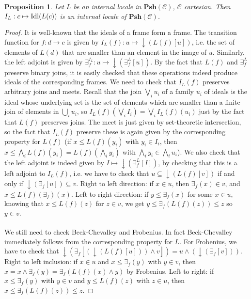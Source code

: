 \documentclass{article}
\newtheorem{proposition}[theorem]{Proposition}
\begin{document}
\begin{proposition}
    Let $L$ be an internal locale in $\mathbf{Psh}(\mathcal{C})$, $\mathcal{C}$ cartesian. Then $I_L: c\mapsto \textup{Idl}(L(c))$ is an internal locale of $\mathbf{Psh}(\mathcal{C})$.
\end{proposition}
\begin{proof}
    It is well-known that the ideals of a frame form a frame. The transition function for $f:d\xrightarrow{}c$ is given by $I_L(f): u \mapsto \downarrow (L(f)[u])$, i.e. the set of elements of $L(d)$ that are smaller than an element in the image of $u$. Similarly, the left adjoint is given by $\exists_f^{I_L}: u \mapsto \downarrow (\exists_f^{L}[u])$. By the fact that $L(f)$ and $\exists_f^L$ preserve binary joins, it is easily checked that these operations indeed produce ideals of the corresponding frames. We  need to check that $I_L(f)$ preserves arbitrary joins and meets. Recall that the join $\bigvee_i u_i$ of a family $u_i$ of ideals is the ideal whose underlying set is the set of elements which are smaller than a finite join of elements in $\bigcup_i u_i$, so $I_L(f)(\bigvee_i I_i)=\bigvee_i I_L(f)(u_i)$ just by the fact that $L(f)$ preserves joins. The meet is just given by set-theoretic intersection, so the fact that $I_L(f)$ preserve these is again given by the corresponding property for $L(f)$ (if $x\leq L(f)(y_i)$ with $y_i\in I_i$, then $x\leq \bigwedge_i L(f)(y_i)=L(f)(\bigwedge_i y_i)$ with $\bigwedge_i y_i\in\bigwedge_i u_i$). We also check that the left adjoint is indeed given by $I \mapsto \downarrow (\exists_f^{L}[I])$, by checking that this is a left adjoint to $I_L(f)$, i.e. we have to check that $u\subseteq \downarrow (L(f)[v])$ if and only if $\downarrow (\exists_f[u])\subseteq v$. Right to left direction: if $x\in u$, then $\exists_f (x)\in v$, and $x\leq L(f)(\exists_f)(x)$. Left to right direction: if $y\leq \exists_f(x)$ for some $x\in u$, knowing that $x\leq L(f)(z)$ for $z\in v$, we get $y\leq \exists_f (L(f)(z))\leq z$ so $y\in v$.\\
    \\
    We still need to check Beck-Chevalley and Frobenius. In fact Beck-Chevalley immediately follows from the corresponding property for $L$. For Frobenius, we have to check that $\downarrow (\exists_f[(\downarrow (L(f)[u]))\land v])= u \land (\downarrow (\exists_f[v]))$. Right to left inclusion: if $x\in u$ and $x\leq\exists_f(y)$ with $y\in v$, then $x=x\land\exists_f(y)=\exists_f(L(f)(x)\land y)$ by Frobenius. Left to right: if $x\leq \exists_f(y)$ with $y\in v$ and $y\leq L(f)(z)$ with $z\in u$, then $x\leq \exists_f(L(f)(z))\leq z$. 
\end{proof}
\end{document}
